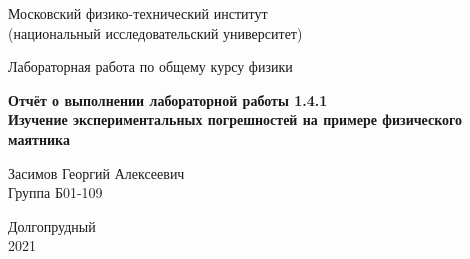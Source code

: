 

\usepackage[T2A]{fontenc}			%
\usepackage[utf8]{inputenc}			%
\usepackage[english,russian]{babel}	%
\usepackage{tikz}
\usepackage{pgfplots}


\usepackage{amsmath,amsfonts,amssymb,amsthm,mathtools} 


\usepackage{wasysym}



\begin{titlepage}

    \newpage
    \begin{center}
        \normalsize Московский физико-технический институт \\(национальный исследовательский университет)
    \end{center}

    \vspace{6em}

    \begin{center}
        \Large Лабораторная работа по общему курсу физики\\
    \end{center}

    \vspace{1em}

    \begin{center}
        \Large \textbf{Отчёт о выполнении лабораторной работы 1.4.1\\ {Изучение экспериментальных погрешностей на примере физического маятника}}
    \end{center}

    \vspace{2em}

    \begin{center}
        \large Засимов Георгий Алексеевич \\
        Группа Б01-109
    \end{center}

    \vspace{\fill}

    \begin{center}
    Долгопрудный \\2021
    \end{center}
    
\end{titlepage}

\newpage

